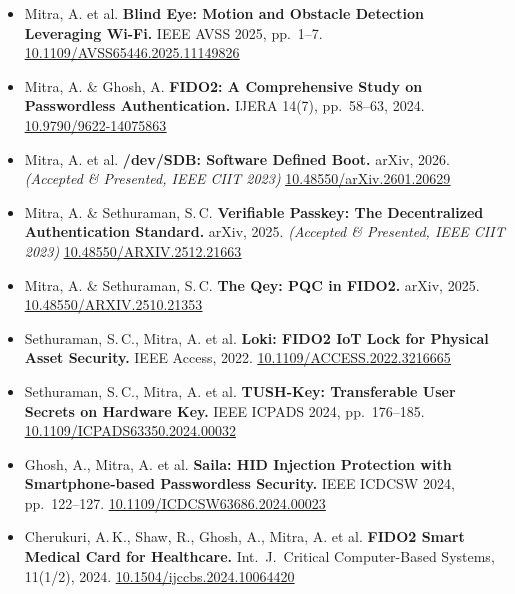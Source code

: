 \documentclass[10pt, a4paper]{article}
\begin{document}
\begin{itemize}
    \item Mitra, A. et al. \textbf{Blind Eye: Motion and Obstacle Detection Leveraging Wi-Fi.} IEEE AVSS 2025, pp.~1--7. \href{https://doi.org/10.1109/AVSS65446.2025.11149826}{\underline{10.1109/AVSS65446.2025.11149826}}

    \item Mitra, A. \& Ghosh, A. \textbf{FIDO2: A Comprehensive Study on Passwordless Authentication.} IJERA 14(7), pp.~58--63, 2024. \href{https://doi.org/10.9790/9622-14075863}{\underline{10.9790/9622-14075863}}

    \item Mitra, A. et al. \textbf{/dev/SDB: Software Defined Boot.} arXiv, 2026. \textit{(Accepted \& Presented, IEEE CIIT 2023)} \href{https://doi.org/10.48550/arXiv.2601.20629}{\underline{10.48550/arXiv.2601.20629}}

    \item Mitra, A. \& Sethuraman, S.\,C. \textbf{Verifiable Passkey: The Decentralized Authentication Standard.} arXiv, 2025. \textit{(Accepted \& Presented, IEEE CIIT 2023)} \href{https://doi.org/10.48550/ARXIV.2512.21663}{\underline{10.48550/ARXIV.2512.21663}}

    \item Mitra, A. \& Sethuraman, S.\,C. \textbf{The Qey: PQC in FIDO2.} arXiv, 2025. \href{https://doi.org/10.48550/ARXIV.2510.21353}{\underline{10.48550/ARXIV.2510.21353}}

    \item Sethuraman, S.\,C., Mitra, A. et al. \textbf{Loki: FIDO2 IoT Lock for Physical Asset Security.} IEEE Access, 2022. \href{https://doi.org/10.1109/ACCESS.2022.3216665}{\underline{10.1109/ACCESS.2022.3216665}}

    \item Sethuraman, S.\,C., Mitra, A. et al. \textbf{TUSH-Key: Transferable User Secrets on Hardware Key.} IEEE ICPADS 2024, pp.~176--185. \href{https://doi.org/10.1109/ICPADS63350.2024.00032}{\underline{10.1109/ICPADS63350.2024.00032}}

    \item Ghosh, A., Mitra, A. et al. \textbf{Saila: HID Injection Protection with Smartphone-based Passwordless Security.} IEEE ICDCSW 2024, pp.~122--127. \href{https://doi.org/10.1109/ICDCSW63686.2024.00023}{\underline{10.1109/ICDCSW63686.2024.00023}}

    \item Cherukuri, A.\,K., Shaw, R., Ghosh, A., Mitra, A. et al. \textbf{FIDO2 Smart Medical Card for Healthcare.} Int.\ J.\ Critical Computer-Based Systems, 11(1/2), 2024. \href{https://doi.org/10.1504/ijccbs.2024.10064420}{\underline{10.1504/ijccbs.2024.10064420}}
\end{itemize}
\end{document}
